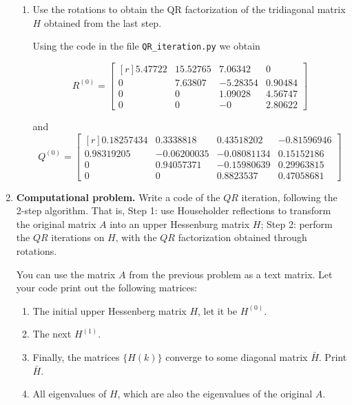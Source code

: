 \documentclass[11pt,oneside,english,reqno]{amsart}
\theoremstyle{definition}
\newcommand{\1}{\mathbbm{1}}
\begin{document}
\begin{enumerate}[leftmargin=*]
\begin{enumerate}
\item Use the rotations to obtain the QR factorization of the tridiagonal matrix $H$ obtained from the last step.

Using the code in the file \verb!QR_iteration.py! we obtain

\begin{equation}
R^{(0)}=\begin{bmatrix*}[r]
5.47722 &15.52765  &7.06342 & 0\\[2mm]   
0   &    7.63807 & -5.28354  & 0.90484\\[2mm]
0     &  0  &     1.09028 & 4.56747\\[2mm]
0    &   0  &    -0   &    2.80622\end{bmatrix*}
\end{equation}

and
\begin{equation}
Q^{(0)} =\begin{bmatrix*}[r]
 0.18257434 & 0.3338818  & 0.43518202 &-0.81596946\\[2mm]
 0.98319205 &-0.06200035 &-0.08081134 & 0.15152186\\[2mm]
 0     &     0.94057371& -0.15980639&  0.29963815\\[2mm]
 0     &     0     &     0.8823537  & 0.47058681\end{bmatrix*}
\end{equation}
\end{enumerate}

\vfill
\pagebreak


\item \textbf{Computational problem.} Write a code of the $QR$ iteration, following the 2-step algorithm. That is, Step 1: use Householder reflections to transform the original matrix $A$ into an upper Hessenburg matrix $H$; Step 2: perform the $QR$ iterations on $H$, with the $QR$ factorization obtained through rotations.

You can use the matrix $A$ from the previous problem as a text matrix. Let your code print out the following matrices:
\begin{enumerate}
\item The initial upper Hessenberg matrix $H$, let it be $H^{(0)}$.
\item The next $H^{(1)}$.
\item Finally, the matrices $\{H(k)\}$ converge to some diagonal matrix $\bar H$. Print $\bar H$.
\item All eigenvalues of $H$, which are also the eigenvalues of the original $A$.
\end{enumerate}


\end{enumerate}
\end{document}
